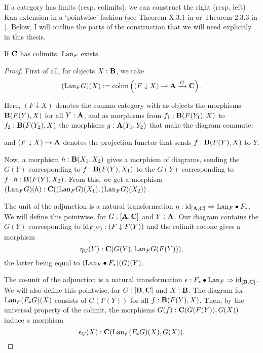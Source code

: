 If a category has limits (resp. colimits), we can construct the right (resp. left) Kan extension in a `pointwise' fashion (see Theorem X.3.1 in \autocite{MacLane} or Theorem 2.3.3 in \autocite{Kashiwara}). Below, I will outline the parts of the construction that we will need explicitly in this thesis.
\begin{lemma}
  If $ \mathbf{C} $ has colimits, $ \text{Lan}_{F} $ exists.
\end{lemma}
\begin{proof}
  First of all, for objects $ X: \mathbf{B} $, we take
  \[ (\text{Lan}_{F}G)(X) := \text{colim} \left( (F \downarrow X) \to \mathbf{A} \xrightarrow G \mathbf{C} \right). \]

  Here, $ (F \downarrow X) $ denotes the comma category with as objects the morphisms $ \mathbf{B}(F(Y), X) $ for all $ Y: \mathbf{A} $, and as morphisms from $ f_1: \mathbf{B}(F(Y_1), X) $ to $ f_2: \mathbf{B}(F(Y_2), X) $ the morphisms $ g: \mathbf{A}(Y_1, Y_2) $ that make the diagram commute:
  \begin{center}
  \end{center}
  and $ (F \downarrow X) \to \mathbf{A} $ denotes the projection functor that sends $ f: \mathbf{B}(F(Y), X) $ to $ Y $.

  Now, a morphism $ h: \mathbf{B}(X_1, X_2) $ gives a morphism of diagrams, sending the $ G(Y) $ corresponding to $ f: \mathbf{B}(F(Y), X_1) $ to the $ G(Y) $ corresponding to $ f \cdot h: \mathbf{B}(F(Y), X_2) $. From this, we get a morphism $ (\text{Lan}_{F}G)(h): \mathbf{C}((\text{Lan}_{F}G)(X_1), (\text{Lan}_{F}G)(X_2)) $.

  The unit of the adjunction is a natural transformation $ \eta: \text{id}_{[\mathbf{A}, \mathbf{C}]} \Rightarrow \text{Lan}_{F} \bullet F_* $. We will define this pointwise, for $ G: [\mathbf{A}, \mathbf{C}] $ and $ Y: \mathbf{A} $. Our diagram contains the $ G(Y) $ corresponding to $ \text{id}_{F(Y)}: (F \downarrow F(Y)) $ and the colimit cocone gives a morphism
  \[ \eta_G(Y) : \mathbf{C}(G(Y), \text{Lan}_{F}G (F(Y))), \]
  the latter being equal to $ (\text{Lan}_{F} \bullet F_*)(G)(Y) $.

  The co-unit of the adjunction is a natural transformation $ \epsilon: F_* \bullet \text{Lan}_{F} \Rightarrow \text{id}_{[\mathbf{B}, \mathbf{C}]} $. We will also define this pointwise, for $ G: [\mathbf{B}, \mathbf{C}] $ and $ X: \mathbf{B} $. The diagram for $ \text{Lan}_{F}(F_* G)(X) $ consists of $ G(F(Y)) $ for all $ f: \mathbf{B}(F(Y), X) $. Then, by the universal property of the colimit, the morphisms $ G(f): \mathbf{C}(G(F(Y)), G(X)) $ induce a morphism
  \[ \epsilon_G(X) : \mathbf{C}(\text{Lan}_{F}(F_* G)(X), G(X)). \]
\end{proof}

